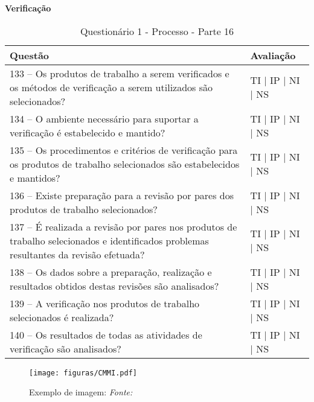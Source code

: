 \documentclass[openany,10pt,a4paper]{article}
\begin{document}
\begin{appendix}
\begin{table}[h]
\textbf{Verificação }
	\centering
	\caption{Questionário 1 - Processo - Parte 16}
	\begin{tabular}{p{3.5in}p{2in}}		
		\toprule
		\textbf{Questão}  & \textbf{Avaliação}\\ 
		\midrule
		133 – Os produtos de trabalho a serem verificados e os métodos de verificação a serem 
utilizados são selecionados?
 & TI | IP | NI | NS \\
        \midrule
		134 – O ambiente necessário para suportar a verificação é estabelecido e mantido?
 & TI | IP | NI | NS \\
		\midrule
		135 – Os procedimentos e critérios de verificação para os produtos de trabalho selecionados são 
estabelecidos e mantidos?
 & TI | IP | NI | NS \\
		\midrule
        136 – Existe preparação para a revisão por pares dos produtos de trabalho selecionados?
 & TI | IP | NI | NS \\
		\midrule
		137 – É realizada a revisão por pares nos produtos de trabalho selecionados e identificados 
problemas resultantes da revisão efetuada?
  & TI | IP | NI | NS \\
		\midrule
		138 – Os dados sobre a preparação, realização e resultados obtidos destas revisões são 
analisados?
 & TI | IP | NI | NS \\
 \midrule
		139 – A verificação nos produtos de trabalho selecionados é realizada?
 & TI | IP | NI | NS \\
  \midrule
		140 – Os resultados de todas as atividades de verificação são analisados? 
 & TI | IP | NI | NS \\
		\bottomrule
	\end{tabular} 
	\label{tab:tabela1}
\end{table}

\begin{figure}[h]
	\centering
	\texttt{[image: figuras/CMMI.pdf]}
	\caption{Exemplo de imagem: \small{\textit{Fonte: 	\cite{CMMI2010}}}}
	\label{fig:figura1}
\end{figure}

\end{appendix}
\end{document}
